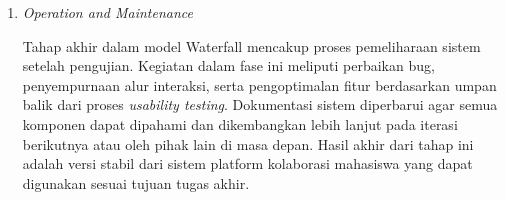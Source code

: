 \begin{enumerate}
Tahap ini menggabungkan ketiga modul menjadi satu platform yang utuh. Proses integrasi mencakup penyatuan alur data, sinkronisasi API atau fungsi internal, serta penyamaan format keluaran, terutama antara modul rekomendasi role dan modul pembentukan tim. Setelah sistem terintegrasi, dilakukan system testing mencakup pengujian fungsional, kompatibilitas alur, dan performa. Sebagai bagian dari prinsip UCD, dilakukan pula usability testing yang menilai kemudahan penggunaan platform oleh mahasiswa sebagai target pengguna. Evaluasi ini menjadi dasar penyempurnaan sistem sebelum memasuki tahap operasional.

\item \textit{Operation and Maintenance}

Tahap akhir dalam model Waterfall mencakup proses pemeliharaan sistem setelah pengujian. Kegiatan dalam fase ini meliputi perbaikan bug, penyempurnaan alur interaksi, serta pengoptimalan fitur berdasarkan umpan balik dari proses \textit{usability testing}. Dokumentasi sistem diperbarui agar semua komponen dapat dipahami dan dikembangkan lebih lanjut pada iterasi berikutnya atau oleh pihak lain di masa depan. Hasil akhir dari tahap ini adalah versi stabil dari sistem platform kolaborasi mahasiswa yang dapat digunakan sesuai tujuan tugas akhir.
\end{enumerate}